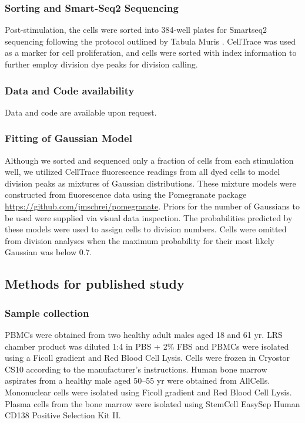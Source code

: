 \subsubsection{Sorting and Smart-Seq2 Sequencing}
Post-stimulation, the cells were sorted into 384-well plates for Smartseq2 sequencing \cite{picelli2014full} following the protocol outlined by Tabula Muris \cite{tabula2022tabula}. CellTrace was used as a marker for cell proliferation, and cells were sorted with index information to further employ division dye peaks for division calling.

\subsubsection{Data and Code availability}
Data and code are available upon request. 

\subsubsection{Fitting of Gaussian Model}
Although we sorted and sequenced only a fraction of cells from each stimulation well, we utilized CellTrace fluorescence readings from all dyed cells to model division peaks as mixtures of Gaussian distributions. These mixture models were constructed from fluorescence data using the Pomegranate package \url{https://github.com/jmschrei/pomegranate}. Priors for the number of Gaussians to be used were supplied via visual data inspection. The probabilities predicted by these models were used to assign cells to division numbers. Cells were omitted from division analyses when the maximum probability for their most likely Gaussian was below 0.7.

\subsection{Methods for published study}

\subsubsection{Sample collection}

PBMCs were obtained from two healthy adult males aged 18 and 61 yr. LRS chamber product was diluted 1:4 in PBS + 2\% FBS and PBMCs were isolated using a Ficoll gradient and Red Blood Cell Lysis. Cells were frozen in Cryostor CS10 according to the manufacturer’s instructions. Human bone marrow aspirates from a healthy male aged 50–55 yr were obtained from AllCells. Mononuclear cells were isolated using Ficoll gradient and Red Blood Cell Lysis. Plasma cells from the bone marrow were isolated using StemCell EasySep Human CD138 Positive Selection Kit II.

